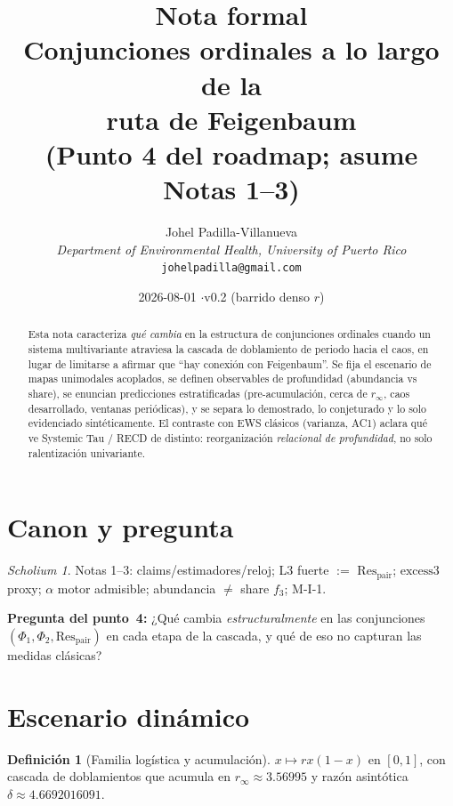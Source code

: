 \documentclass[11pt,a4paper]{article}
\title{\textbf{Nota formal}\\[0.4em]
\large Conjunciones ordinales a lo largo de la\\
ruta de Feigenbaum\\[0.6em]
\normalsize (Punto 4 del roadmap; asume Notas 1--3)}
\author{
Johel Padilla-Villanueva\\
\textit{Department of Environmental Health, University of Puerto Rico}\\
\texttt{johelpadilla@gmail.com}
}
\date{2026-08-01 \quad$\cdot$\quad v0.2 (barrido denso $r$)}
\theoremstyle{definition}
\newtheorem{definition}{Definici\'on}[section]
\theoremstyle{plain}
\theoremstyle{remark}
\newtheorem{scholium}{Scholium}[section]
\newcommand{\Res}{\mathrm{Res}}
\newcommand{\excess}{\mathrm{excess3}}
\begin{document}
\maketitle

\begin{abstract}
Esta nota caracteriza \emph{qu\'e cambia} en la estructura de
conjunciones ordinales cuando un sistema multivariante atraviesa la
cascada de doblamiento de periodo hacia el caos, en lugar de limitarse a
afirmar que ``hay conexi\'on con Feigenbaum''. Se fija el escenario de
mapas unimodales acoplados, se definen observables de profundidad
(abundancia vs share), se enuncian predicciones estratificadas
(pre-acumulaci\'on, cerca de $r_\infty$, caos desarrollado, ventanas
peri\'odicas), y se separa lo demostrado, lo conjeturado y lo solo
evidenciado sint\'eticamente. El contraste con EWS cl\'asicos
(varianza, AC1) aclara qu\'e ve Systemic Tau / RECD de distinto:
reorganizaci\'on \emph{relacional de profundidad}, no solo
ralentizaci\'on univariante.
\end{abstract}

\tableofcontents
\vspace{1em}

\section{Canon y pregunta}
\label{sec:q}

\begin{scholium}
Notas 1--3: claims/estimadores/reloj; L3 fuerte $:=$ $\Res_{\mathrm{pair}}$;
$\excess$ proxy; $\alpha$ motor admisible; abundancia $\ne$ share $f_3$;
M-I-1.
\end{scholium}

\textbf{Pregunta del punto~4:}
¿Qu\'e cambia \emph{estructuralmente} en las conjunciones
$(\Phi_1,\Phi_2,\Res_{\mathrm{pair}})$ en cada etapa de la cascada, y
qu\'e de eso no capturan las medidas cl\'asicas?

\section{Escenario din\'amico}
\label{sec:scene}

\begin{definition}[Familia log\'istica y acumulaci\'on]
\label{def:logistic}
$x\mapsto r x(1-x)$ en $[0,1]$, con cascada de doblamientos que
acumula en $r_\infty\approx 3.56995$ y raz\'on asint\'otica
$\delta\approx 4.6692016091$.
\end{definition}
\end{document}

